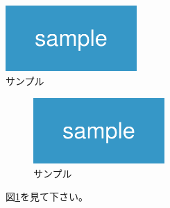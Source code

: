 \documentclass[11pt]{jsarticle}
\begin{document}
\begin{center}
  \includegraphics[width=5cm]{figures/sample.png} \\
  サンプル
\end{center}

\begin{figure}[ht]
  \centering
  \includegraphics[width=5cm]{figures/sample.png}
  \caption{サンプル}
  \label{sample}
\end{figure}

図\ref{sample}を見て下さい。
\end{document}
